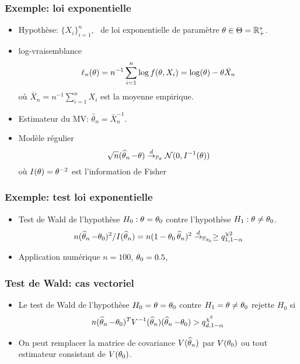 \begin{frame}
\frametitle{Exemple: loi exponentielle}
\begin{itemize}
\item \alert{Hypothèse}: $\{X_i\}_{i=1}^n$, \iid\ de loi exponentielle de paramètre $\theta \in \Theta= \mathbb{R}_+^*$.
\item \alert{log-vraisemblance}
\[
\ell_n(\theta)= n^{-1} \sum_{i=1}^n \log f(\theta,X_i)= \log(\theta) - \theta \bar{X}_n
\]
où $\bar{X}_n= n^{-1} \sum_{i=1}^n X_i$ est la moyenne empirique.
\item Estimateur du MV: $\hat{\theta}_n = \bar{X}_n^{-1}$.
\item \alert{Modèle régulier}
\[
\sqrt{n} (\operatorname{\widehat \theta_{\mathnormal{n}}} - \theta) \stackrel{d}{\rightarrow}_{\operatorname{{\mathbb P}}_{\theta}} \mathcal{N}(0,I^{-1}(\theta))
\]
où $I(\theta)= \theta^{-2}$ est l'\alert{information de Fisher}
\end{itemize}
\end{frame}

\begin{frame}
\frametitle{Exemple: test loi exponentielle}
\begin{itemize}
\item \alert{Test de Wald} de l'hypothèse $H_0: \theta = \theta_0$ contre l'hypothèse $H_1: \theta \ne \theta_0$.
\begin{align*}
n (\operatorname{\widehat \theta_{\mathnormal{n}}} - \theta_0)^2/I(\operatorname{\widehat \theta_{\mathnormal{n}}})= n (1 - \theta_0 \operatorname{\widehat \theta_{\mathnormal{n}}})^2 \stackrel{d}{\rightarrow}_{\operatorname{{\mathbb P}}_{\theta_0}} \geq q^{\chi2}_{1,1-\alpha}
\end{align*}
\item \alert{Application numérique} $n=100$, $\theta_0=0.5$,
\end{itemize}
\end{frame}


\begin{frame}
\frametitle{Test de Wald: cas vectoriel}
\begin{itemize}
\item Le test de Wald de l'hypothèse $H_0= \theta= \theta_0$ contre $H_1= \theta \ne \theta_0$
rejette $H_0$ si
\[
n (\operatorname{\widehat \theta_{\mathnormal{n}}} - \theta_0)^T V^{-1}(\operatorname{\widehat \theta_{\mathnormal{n}}}) (\operatorname{\widehat \theta_{\mathnormal{n}}} - \theta_0) > q^{\chi^2}_{d,1-\alpha} \,
\]
\item On peut remplacer la matrice de covariance $V(\operatorname{\widehat \theta_{\mathnormal{n}}})$ par $V(\theta_0)$ ou tout estimateur consistant de $V(\theta_0)$.
\end{itemize}
\end{frame}


